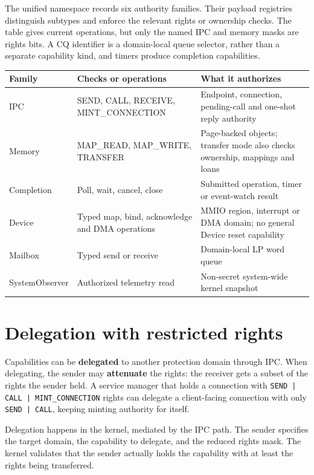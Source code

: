 The unified namespace records six authority families. Their payload registries
distinguish subtypes and enforce the relevant rights or ownership checks. The
table gives current operations, but only the named IPC and memory masks are rights
bits. A CQ identifier is a domain-local queue selector, rather than a separate
capability kind, and timers produce completion capabilities.

\begin{longtable}{|p{2.8cm}|p{3.5cm}|p{5.9cm}|}
\hline
\textbf{Family} & \textbf{Checks or operations} & \textbf{What it authorizes} \\
\hline
IPC & SEND, CALL, RECEIVE, MINT\_\allowbreak CONNECTION & Endpoint, connection, pending-call and one-shot reply authority \\
Memory & MAP\_READ, MAP\_WRITE, TRANSFER & Page-backed objects; transfer mode also checks ownership, mappings and loans \\
Completion & Poll, wait, cancel, close & Submitted operation, timer or event-watch result \\
Device & Typed map, bind, acknowledge and DMA operations & MMIO region, interrupt or DMA domain; no general Device reset capability \\
Mailbox & Typed send or receive & Domain-local LP word queue \\
SystemObserver & Authorized telemetry read & Non-secret system-wide kernel snapshot \\
\hline
\end{longtable}

\section{Delegation with restricted rights}

Capabilities can be \textbf{delegated} to another protection domain through IPC.
When delegating, the sender may \textbf{attenuate} the rights: the receiver gets a
subset of the rights the sender held. A service manager that holds a connection
with \texttt{SEND | CALL | MINT\_CONNECTION} rights can delegate a client-facing
connection with only \texttt{SEND | CALL}, keeping minting authority for itself.

Delegation happens in the kernel, mediated by the IPC path. The sender specifies
the target domain, the capability to delegate, and the reduced rights mask. The
kernel validates that the sender actually holds the capability with at least the
rights being transferred.


